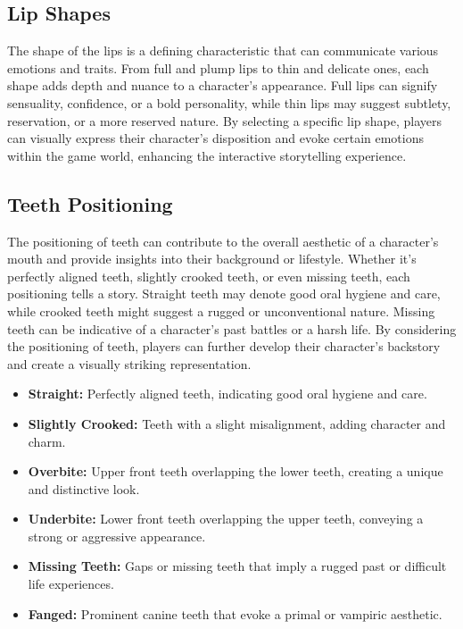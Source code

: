 \documentclass[12pt]{book}  %
\begin{document}
\subsection{\textbf{Lip Shapes}}

The shape of the lips is a defining characteristic that can communicate various emotions and traits. From full and plump lips to thin and delicate ones, each shape adds depth and nuance to a character's appearance. Full lips can signify sensuality, confidence, or a bold personality, while thin lips may suggest subtlety, reservation, or a more reserved nature. By selecting a specific lip shape, players can visually express their character's disposition and evoke certain emotions within the game world, enhancing the interactive storytelling experience.

\subsection{\textbf{Teeth Positioning}}

The positioning of teeth can contribute to the overall aesthetic of a character's mouth and provide insights into their background or lifestyle. Whether it's perfectly aligned teeth, slightly crooked teeth, or even missing teeth, each positioning tells a story. Straight teeth may denote good oral hygiene and care, while crooked teeth might suggest a rugged or unconventional nature. Missing teeth can be indicative of a character's past battles or a harsh life. By considering the positioning of teeth, players can further develop their character's backstory and create a visually striking representation.

\begin{itemize}
    \item \textbf{Straight:} Perfectly aligned teeth, indicating good oral hygiene and care.
    \item \textbf{Slightly Crooked:} Teeth with a slight misalignment, adding character and charm.
    \item \textbf{Overbite:} Upper front teeth overlapping the lower teeth, creating a unique and distinctive look.
    \item \textbf{Underbite:} Lower front teeth overlapping the upper teeth, conveying a strong or aggressive appearance.
    \item \textbf{Missing Teeth:} Gaps or missing teeth that imply a rugged past or difficult life experiences.
    \item \textbf{Fanged:} Prominent canine teeth that evoke a primal or vampiric aesthetic.
\end{itemize}
\end{document}
